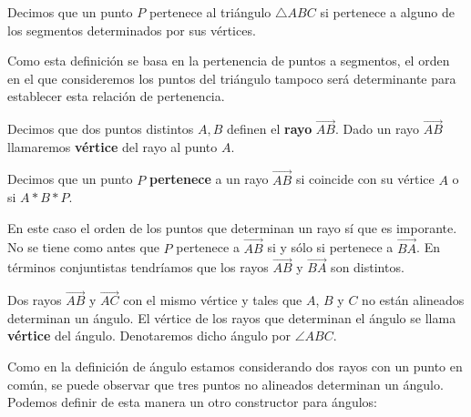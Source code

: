 \begin{defin*}
	Decimos que un punto $P$ pertenece al triángulo $\triangle ABC$ si pertenece
	a alguno de los segmentos determinados por sus vértices.
\end{defin*}


Como esta definición se basa en la pertenencia de puntos a segmentos, el orden
en el que consideremos los puntos del triángulo tampoco será determinante para
establecer esta relación de pertenencia.

\begin{defin*}[Rayos]
	Decimos que dos puntos distintos $A, B$ definen el \textbf{rayo}
	$\overrightarrow{AB}$. Dado un rayo $\overrightarrow{AB}$ llamaremos
	\textbf{vértice} del rayo al punto $A$.
\end{defin*}


\begin{defin*}
	Decimos que un punto $P$ \textbf{pertenece} a un rayo $\overrightarrow{AB}$
	si coincide con su vértice $A$ o si $A * B * P$.
\end{defin*}


En este caso el orden de los puntos que determinan un rayo sí que es imporante.
No se tiene como antes que $P$ pertenece a $\overrightarrow{AB}$ si y sólo si
pertenece a $\overrightarrow{BA}$. En términos conjuntistas tendríamos que los
rayos $\overrightarrow{AB}$ y $\overrightarrow{BA}$ son distintos.

\begin{defin*}[Ángulos]
	Dos rayos $\overrightarrow{AB}$ y $\overrightarrow{AC}$ con el mismo vértice
	y tales que $A$, $B$ y $C$ no están alineados determinan un ángulo.
	El vértice de los rayos que determinan el ángulo se llama \textbf{vértice}
	del ángulo. Denotaremos dicho ángulo por $\angle ABC$.
\end{defin*}


Como en la definición de ángulo estamos considerando dos rayos con un punto en
común, se puede observar que tres puntos no alineados determinan un ángulo.
Podemos definir de esta manera un otro constructor para ángulos:


